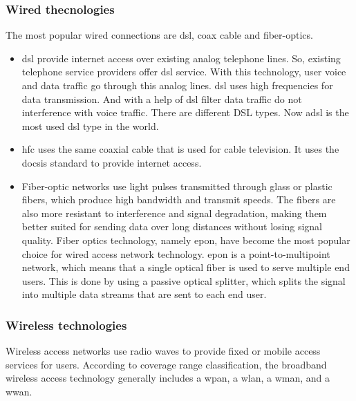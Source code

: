 \subsubsection{Wired thecnologies}

The most popular wired connections are \ac{dsl}, coax cable and fiber-optics.

\begin{itemize}

    \item \ac{dsl} provide internet access over existing analog telephone lines. So, existing telephone service providers offer \ac{dsl} service. With this technology, user voice and data traffic go through this analog lines. \ac{dsl} uses high frequencies for data transmission. And with a help of \ac{dsl} filter data traffic do not interference with voice traffic.
    There are different DSL types. Now \ac{adsl} is the most used \ac{dsl} type in the world. 

    \item \ac{hfc} uses the same coaxial cable that is used for cable television. It uses the \ac{docsis} standard to provide internet access.

    \item Fiber-optic networks use light pulses transmitted through glass or plastic fibers, which produce high bandwidth and transmit speeds. 
    The fibers are also more resistant to interference and signal degradation, making them better suited for sending data over long distances without losing signal quality.
    Fiber optics technology, namely \ac{epon}, have become the most popular choice for wired access network technology. \ac{epon} is a point-to-multipoint network, which means that a single optical fiber is used to serve multiple end users. This is done by using a passive optical splitter, which splits the signal into multiple data streams that are sent to each end user.

\end{itemize}


\subsubsection{Wireless technologies}

Wireless access networks use radio waves to provide fixed or mobile access services for users. 
According to coverage range classification, the broadband wireless access technology generally includes a \ac{wpan}, a \ac{wlan}, a \ac{wman}, and a \ac{wwan}.

